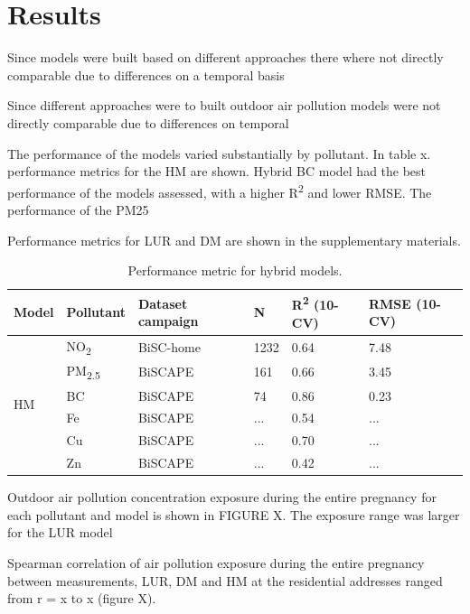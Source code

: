 \documentclass{article}
\begin{document}
\newpage
\section{Results}

Since models were built based on different approaches there where not directly comparable due to differences on a temporal basis

Since different approaches were to built outdoor air pollution models were not directly comparable due to differences on temporal 




The performance of the models varied substantially by pollutant. In table x. performance metrics for the HM are shown. Hybrid BC model had the best performance of the models assessed, with a higher R\textsuperscript{2} and lower RMSE. The performance of the PM25 

Performance metrics for LUR and DM are shown in the supplementary materials. 

\begin{table}[ht]
\centering
\caption{Performance metric for hybrid models.}
\begin{tabular}{llllll}
\toprule
\textbf{Model} & \textbf{Pollutant} & \textbf{Dataset campaign} & \textbf{N} & \textbf{R\textsuperscript{2} (10-CV)} & \textbf{RMSE (10-CV)} \\
\midrule
\multirow{6}{*}{HM} & NO\textsubscript{2} & BiSC-home & 1232 & 0.64 & 7.48 \\
& PM\textsubscript{2.5} & BiSCAPE & 161 & 0.66 & 3.45 \\
& BC & BiSCAPE & 74 & 0.86 &  0.23 \\
& Fe & BiSCAPE & ... & 0.54 & ... \\
& Cu & BiSCAPE & ... & 0.70 & ... \\
& Zn & BiSCAPE & ... & 0.42 & ... \\
\bottomrule
\end{tabular}
\label{tab:my_label}
\end{table}




Outdoor air pollution concentration exposure during the entire pregnancy for each pollutant and model is shown in FIGURE X. The exposure range was larger for the LUR model

Spearman correlation of air pollution exposure during the entire pregnancy between measurements, LUR, DM and HM at the residential addresses ranged from r = x to x (figure X). 
\end{document}
